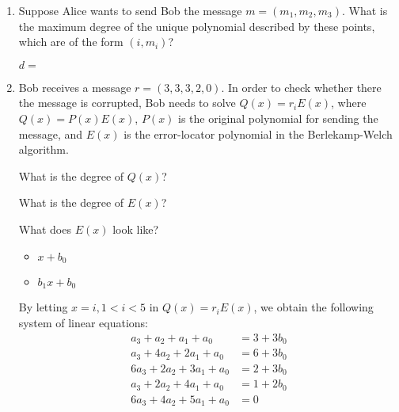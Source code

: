 \documentclass[11pt,preview]{standalone} %
\begin{document}
\begin{enumerate}
\begin{enumerate}
\begin{Freeform}{7}
    \end{Freeform}
  \item Suppose Alice wants to send Bob the message $m = (m_1, m_2,
    m_3)$. What is the maximum degree of the unique polynomial
    described by these points, which are of the form $(i,m_i)$?
    \begin{Freeform}{2}
      $d = $
    \end{Freeform}
  \item Bob receives a message $r = (3, 3, 3, 2, 0)$. In order
    to check whether there the message is corrupted, Bob needs to
    solve $Q(x) = r_iE(x)$, where $Q(x) = P(x)E(x)$, $P(x)$ is the
    original polynomial for sending the message, and $E(x)$ is the
    error-locator polynomial in the Berlekamp-Welch algorithm.\\
    \begin{Freeform}{3}
      What is the degree of $Q(x)$?
    \end{Freeform}
    \begin{Freeform}{1}
      What is the degree of $E(x)$?
    \end{Freeform}
    \begin{Choices}
      What does $E(x)$ look like?
      \begin{itemize}
      \TrueChoice \item $x+b_0$
      \FalseChoice \item $b_1x+b_0$
      \end{itemize}
    \end{Choices}
    By letting $x = i, 1<i<5$ in $Q(x) = r_iE(x)$, we obtain the following system of linear equations:\\
    \begin{align}
      a_3 + a_2 + a_1 + a_0 &= 3 + 3b_0\\
      a_3 + 4a_2 + 2a_1 + a_0 &= 6 + 3b_0\\
      6a_3 + 2a_2 + 3a_1 + a_0 &= 2 + 3b_0\\
      a_3 + 2a_2 + 4a_1 + a_0 &= 1 + 2b_0\\
      6a_3 + 4a_2 + 5a_1 + a_0 &= 0
    \end{align}

\end{enumerate}
\end{enumerate}
\end{document}
